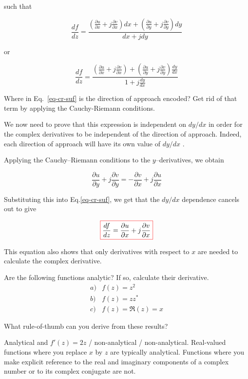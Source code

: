 such that

\begin{equation}
\frac{d f}{d z} = \frac{\left(\frac{\partial u}{\partial x}+j\frac{\partial v}{\partial x}\right) d x+\left(\frac{\partial u}{\partial y}+j\frac{\partial v}{\partial y}\right) d y}{d x + j d y}
\end{equation} 

or

\begin{equation}
\frac{d f}{d z} = \frac{\left(\frac{\partial u}{\partial x}+j\frac{\partial v}{\partial x}\right) +\left(\frac{\partial u}{\partial y}+j\frac{\partial v}{\partial y}\right) \frac{d y}{d x}}{1 + j \frac{d y}{d x}} \label{eq-cr-suf}
\end{equation} 

\begin{cue}
Where in Eq.~\ref{eq-cr-suf} is the direction of approach encoded? Get rid of that term by applying the Cauchy-Riemann conditions.
\end{cue}

We now need to prove that this expression is independent on $d y / d x$ in order for the complex derivatives to be independent of the direction of approach. Indeed, each direction of approach will have its own value of $d y / d x$ .

Applying the Cauchy--Riemann conditions to the $y$--derivatives, we obtain

\begin{equation}
\frac{\partial u}{\partial y}+j\frac{\partial v}{\partial y} = -\frac{\partial v}{\partial x}+j\frac{\partial u}{\partial x}
\end{equation}

Substituting this into Eq.\ref{eq-cr-suf}, we get that the $d y / d x$ dependence cancels out to give

\begin{equation}
\fbox{$\displaystyle
\frac{d f}{d z} = \frac{\partial u}{\partial x}+j\frac{\partial v}{\partial x}
$}
\end{equation} 

This equation also shows that only derivatives with respect to $x$ are needed to calculate the complex derivative.

\begin{exer}
Are the following functions analytic? If so, calculate their derivative.
$$\begin{array}{lcll}a) & f(z)=z^2 \\b) & f(z)=z z^* \\c) & f(z)= \Re(z)=x \end{array}$$

What rule-of-thumb can you derive from these results?

\begin{sol}
Analytical and $f'(z)=2z$ / non-analytical / non-analytical. Real-valued functions where you replace $x$ by $z$ are typically analytical. Functions where you make explicit reference to the real and imaginary components of a complex number or to its complex conjugate are not.
\end{sol}
  
\end{exer}

